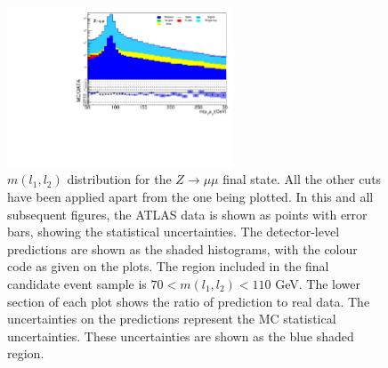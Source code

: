 \begin{figure}[htbp]
	\centering
	\includegraphics[width=0.6\textwidth]{figures/Fig7.pdf}
	\caption{$m(l_1,l_2)$ distribution for the $Z\to\mu\mu$ final state. All the other cuts have been applied apart from the one being plotted. In this and all subsequent figures, the ATLAS data is shown as points with error bars, showing the statistical uncertainties. The detector-level predictions are shown as the shaded histograms, with the colour code as given on the plots. The region included in the final candidate event sample is $70<m(l_1,l_2)<11	0$ GeV. The lower section of each plot shows the ratio of prediction to real data. The uncertainties on the predictions represent the MC statistical uncertainties. These uncertainties are shown as the blue shaded region.}
	\label{Fig7s}
\end{figure}

